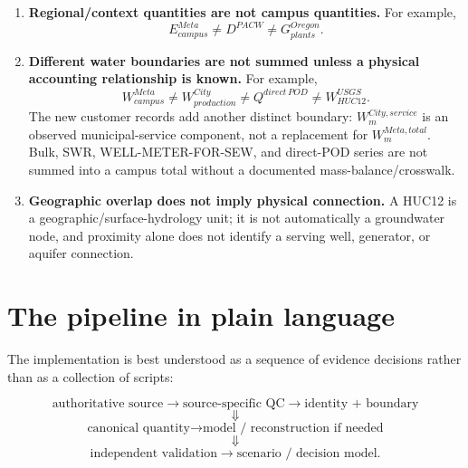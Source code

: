 \documentclass[11pt]{article}
\newcommand{\latesttxt}[1]{\textcolor{purple!85!black}{#1}}
\begin{document}
\begin{enumerate}
\item \textbf{Regional/context quantities are not campus quantities.}
For example,
\[
E^{Meta}_{campus}\neq D^{PACW}\neq G^{Oregon}_{plants}.
\]

\item \textbf{Different water boundaries are not summed unless a physical accounting relationship is known.}
For example,
\[
W^{Meta}_{campus}
\neq
W^{City}_{production}
\neq
Q^{direct\,POD}
\neq
W^{USGS}_{HUC12}.
\]
\latesttxt{The new customer records add another distinct boundary: \(W^{City,service}_m\) is an observed municipal-service component, not a replacement for \(W^{Meta,total}_m\). Bulk, SWR, WELL-METER-FOR-SEW, and direct-POD series are not summed into a campus total without a documented mass-balance/crosswalk.}

\item \textbf{Geographic overlap does not imply physical connection.}
A HUC12 is a geographic/surface-hydrology unit; it is not automatically a groundwater node, and proximity alone does not identify a serving well, generator, or aquifer connection.
\end{enumerate}

\section{The pipeline in plain language}

The implementation is best understood as a sequence of evidence decisions rather than as a collection of scripts:

\[
\boxed{\text{authoritative source}}
\rightarrow
\boxed{\text{source-specific QC}}
\rightarrow
\boxed{\text{identity + boundary}}
\]
\[
\Downarrow
\]
\[
\boxed{\text{canonical quantity}}
\rightarrow
\boxed{\text{model / reconstruction if needed}}
\]
\[
\Downarrow
\]
\[
\boxed{\text{independent validation}}
\rightarrow
\boxed{\text{scenario / decision model}}.
\]
\end{document}
